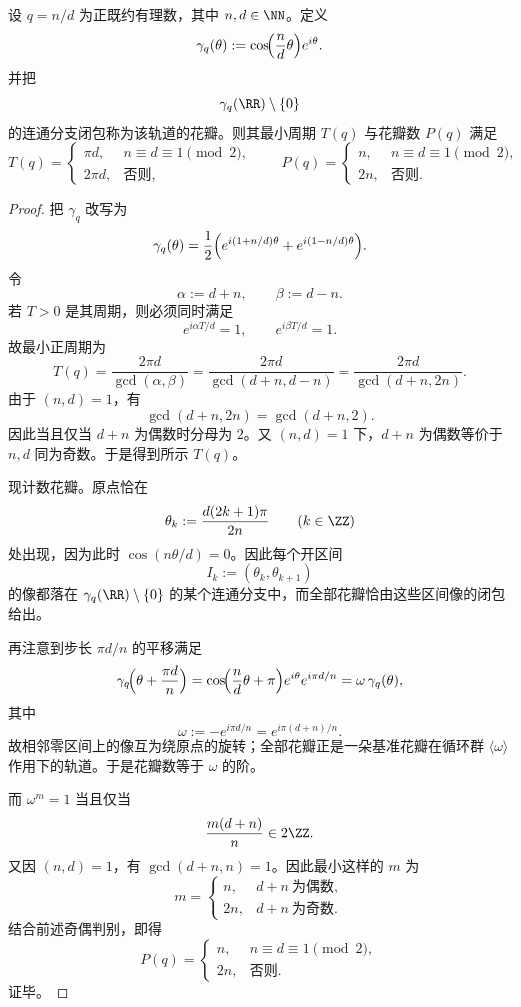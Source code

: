 \begin{theorem}[有理玫瑰轨道的最小周期与花瓣数分类]\label{thm:xi-time-part62d-rational-rose-period-petal-classification}
设 \(q=n/d\) 为正既约有理数，其中 \(n,d\in\NN\)。定义
\[
\gamma_q(\theta):=\cos\!\Bigl(\frac{n}{d}\theta\Bigr)e^{i\theta}.
\]
并把
\[
\gamma_q(\RR)\setminus\{0\}
\]
的连通分支闭包称为该轨道的花瓣。则其最小周期 \(T(q)\) 与花瓣数 \(P(q)\) 满足
\[
T(q)=
\begin{cases}
\pi d, & n\equiv d\equiv 1\pmod 2,\\[1mm]
2\pi d, & \text{否则},
\end{cases}
\qquad
P(q)=
\begin{cases}
n, & n\equiv d\equiv 1\pmod 2,\\[1mm]
2n, & \text{否则}.
\end{cases}
\]
\end{theorem}
\begin{proof}
把 \(\gamma_q\) 改写为
\[
\gamma_q(\theta)
=
\frac12\Bigl(
e^{i(1+n/d)\theta}+e^{i(1-n/d)\theta}
\Bigr).
\]
令
\[
\alpha:=d+n,
\qquad
\beta:=d-n.
\]
若 \(T>0\) 是其周期，则必须同时满足
\[
e^{i\alpha T/d}=1,
\qquad
e^{i\beta T/d}=1.
\]
故最小正周期为
\[
T(q)
=
\frac{2\pi d}{\gcd(\alpha,\beta)}
=
\frac{2\pi d}{\gcd(d+n,d-n)}
=
\frac{2\pi d}{\gcd(d+n,2n)}.
\]
由于 \((n,d)=1\)，有
\[
\gcd(d+n,2n)=\gcd(d+n,2).
\]
因此当且仅当 \(d+n\) 为偶数时分母为 \(2\)。又 \((n,d)=1\) 下，\(d+n\) 为偶数等价于 \(n,d\) 同为奇数。于是得到所示 \(T(q)\)。

现计数花瓣。原点恰在
\[
\theta_k:=\frac{d(2k+1)\pi}{2n}
\qquad (k\in\ZZ)
\]
处出现，因为此时 \(\cos(n\theta/d)=0\)。因此每个开区间
\[
I_k:=(\theta_k,\theta_{k+1})
\]
的像都落在 \(\gamma_q(\RR)\setminus\{0\}\) 的某个连通分支中，而全部花瓣恰由这些区间像的闭包给出。

再注意到步长 \(\pi d/n\) 的平移满足
\[
\gamma_q\!\Bigl(\theta+\frac{\pi d}{n}\Bigr)
=
\cos\!\Bigl(\frac{n}{d}\theta+\pi\Bigr)e^{i\theta}e^{i\pi d/n}
=
\omega\,\gamma_q(\theta),
\]
其中
\[
\omega:=-e^{i\pi d/n}=e^{i\pi(d+n)/n}.
\]
故相邻零区间上的像互为绕原点的旋转；全部花瓣正是一朵基准花瓣在循环群 \(\langle \omega\rangle\) 作用下的轨道。于是花瓣数等于 \(\omega\) 的阶。

而 \(\omega^m=1\) 当且仅当
\[
\frac{m(d+n)}{n}\in 2\ZZ.
\]
又因 \((n,d)=1\)，有 \(\gcd(d+n,n)=1\)。因此最小这样的 \(m\) 为
\[
m=
\begin{cases}
n, & d+n\ \text{为偶数},\\
2n, & d+n\ \text{为奇数}.
\end{cases}
\]
结合前述奇偶判别，即得
\[
P(q)=
\begin{cases}
n, & n\equiv d\equiv 1\pmod 2,\\
2n, & \text{否则}.
\end{cases}
\]
证毕。
\end{proof}

